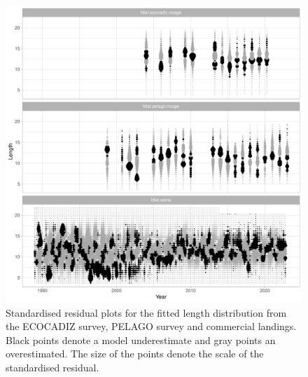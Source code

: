 \documentclass[review]{elsarticle}
\begin{document}
\begin{figure}[h!]
 \centering
 \includegraphics{./resildist.pdf}
 \caption{ Standardised residual plots for the fitted length distribution
from the ECOCADIZ survey, PELAGO survey and commercial landings. Black points denote a model underestimate and
gray points an overestimated. The size of the points denote the scale of the standardised
residual.}
 \label{resildist}
\end{figure}
\end{document}
